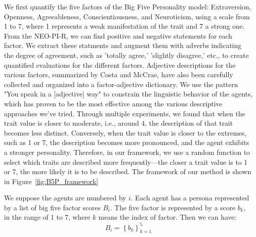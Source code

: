 \documentclass[11pt]{article}
\begin{document}
We first quantify the five factors of the Big Five Personality model: Extraversion, Openness, Agreeableness, Conscientiousness, and Neuroticism, using a scale from 1 to 7, where 1 represents a weak manifestation of the trait and 7 a strong one. From the NEO-PI-R, we can find positive and negative statements for each factor. We extract these statments and augment them with adverbs indicating the degree of agreement, such as 'totally agree,' 'slightly disagree,' etc., to create quantified evaluations for the different factors. Adjective descriptions for the various factors, summarized by Costa and McCrae, have also been carefully collected and organized into a factor-adjective dictionary. We use the pattern "You speak in a [adjective] way" to constrain the linguistic behavior of the agents, which has proven to be the most effective among the various descriptive approaches we've tried. Through multiple experiments, we found that when the trait value is closer to moderate, i.e., around 4, the description of that trait becomes less distinct. Conversely, when the trait value is closer to the extremes, such as 1 or 7, the description becomes more pronounced, and the agent exhibits a stronger personality. Therefore, in our framework, we use a random function to select which traits are described more frequently—the closer a trait value is to 1 or 7, the more likely it is to be described. The framework of our method is shown in Figure~\ref{fig:B5P_framework}

We suppose the agents are numbered by $ i $. Each agent has a persona represented by a list of big five factor scores $ B_i $. The five factor is represented by a score $ b_k $, in the range of 1 to 7, where $ k $ means the index of factor. Then we can have:
\begin{equation}
  B_i ={\left\{ b_k \right\}}_{k=1}^{5}
\end{equation}
\end{document}
